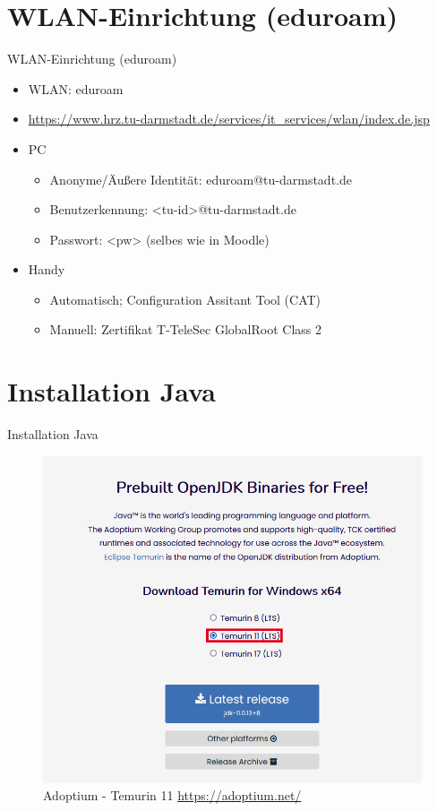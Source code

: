 \documentclass{../tuda-beamer}
\begin{document}
  \section{WLAN-Einrichtung (eduroam)}
  \begin{frame}{WLAN-Einrichtung (eduroam)}
    \begin{itemize}
      \item WLAN: eduroam
      \item \small \url{https://www.hrz.tu-darmstadt.de/services/it_services/wlan/index.de.jsp}
      \item PC
      \begin{itemize}
        \item Anonyme/Äußere Identität: eduroam@tu-darmstadt.de
        \item Benutzerkennung: <tu-id>@tu-darmstadt.de
        \item Passwort: <pw> (selbes wie in Moodle)
      \end{itemize}
      \item Handy
      \begin{itemize}
        \item Automatisch; Configuration Assitant Tool (CAT)
        \item Manuell: Zertifikat T-TeleSec GlobalRoot Class 2
      \end{itemize}
    \end{itemize}
  \end{frame}


  \section{Installation Java}
  \begin{frame}{Installation Java}
    \begin{figure}[h]
      \centering
      \includegraphics[width=.35\linewidth]{graphics/temurin_11.png}
      \caption{Adoptium - Temurin 11 \url{https://adoptium.net/}}
    \end{figure}
  \end{frame}
\end{document}
